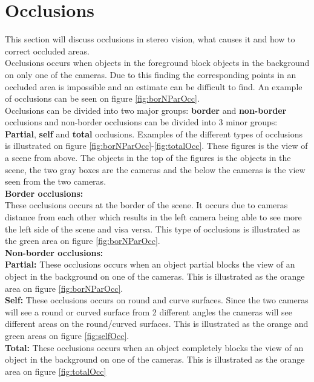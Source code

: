\section{Occlusions}
This section will discuss occlusions in stereo vision, what causes it and how to correct occluded areas.\\

Occlusions occurs when objects in the foreground block objects in the background on only one of the cameras. Due to this finding the corresponding points in an occluded area is impossible and an estimate can be difficult to find. An example of occlusions can be seen on figure \ref{fig:borNParOcc}. \\

Occlusions can be divided into two major groups: \textbf{border} and \textbf{non-border} occlusions and non-border occlusions can be divided into 3 minor groups: \textbf{Partial}, \textbf{self} and \textbf{total} occlusions. Examples of the different types of occlusions is illustrated on figure \ref{fig:borNParOcc}-\ref{fig:totalOcc}. These figures is the view of a scene from above. The objects in the top of the figures is the objects in the scene, the two gray boxes are the cameras and the below the cameras is the view seen from the two cameras.\\

\textbf{Border occlusions:} \\
These occlusions occurs at the border of the scene. It occurs due to cameras distance from each other which results in the left camera being able to see more the left side of the scene and visa versa. This type of occlusions is illustrated as the green area on figure \ref{fig:borNParOcc}. \\
\textbf{Non-border occlusions:}\\
\textbf{Partial:} These occlusions occurs when an object partial blocks the view of an object in the background on one of the cameras. This is illustrated as the orange area on figure \ref{fig:borNParOcc}.  \\
\textbf{Self:} These occlusions occurs on round and curve surfaces. Since the two cameras will see a round or curved surface from 2 different angles the cameras will see different areas on the round/curved surfaces. This is illustrated as the orange and green areas on figure \ref{fig:selfOcc}. \\
\textbf{Total:} These occlusions occurs when an object completely blocks the view of an object in the background on one of the cameras. This is illustrated as the orange area on figure \ref{fig:totalOcc}\\

